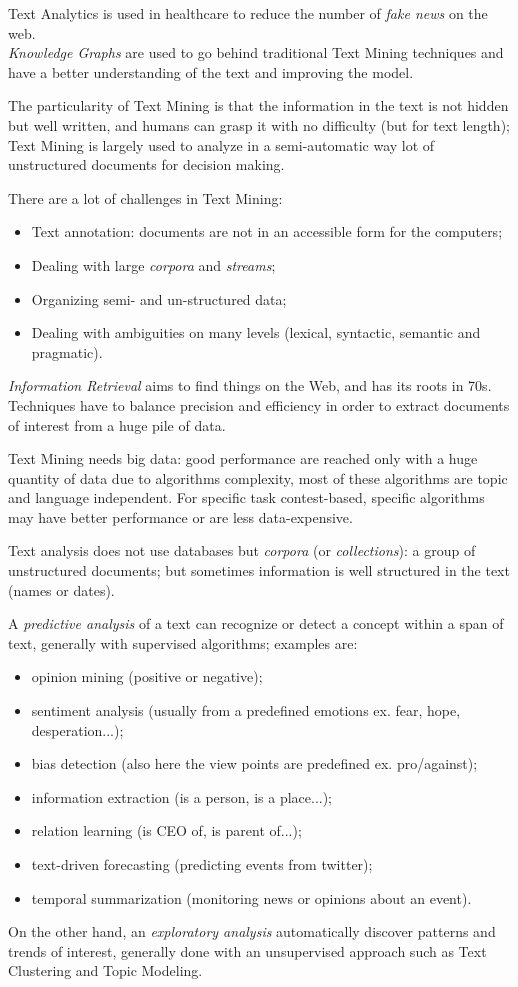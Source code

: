 \documentclass[11pt, a4page]{article}
\begin{document}
Text Analytics is used in healthcare to reduce the number of \textit{fake news} on the web.\\
\textit{Knowledge Graphs} are used to go behind traditional Text Mining techniques and have a better understanding of the text and improving the model.

The particularity of Text Mining is that the information in the text is not hidden but well written, and humans can grasp it with no difficulty (but for text length); Text Mining is largely used to analyze in a semi-automatic way lot of unstructured documents for decision making.

There are a lot of challenges in Text Mining:
\begin{itemize}[noitemsep]
\item Text annotation: documents are not in an accessible form for the computers;
\item Dealing with large \textit{corpora} and \textit{streams};
\item Organizing semi- and un-structured data;
\item Dealing with ambiguities on many levels (lexical, syntactic, semantic and pragmatic).
\end{itemize}

\textit{Information Retrieval} aims to find things on the Web, and has its roots in 70s.
Techniques have to balance precision and efficiency in order to extract documents of interest from a huge pile of data.

Text Mining needs big data: good performance are reached only with a huge quantity of data due to algorithms complexity, most of these algorithms are topic and language independent.
For specific task contest-based, specific algorithms may have better performance or are less data-expensive.

Text analysis does not use databases but \textit{corpora} (or \textit{collections}): a group of unstructured documents; but sometimes information is well structured in the text (names or dates). 

A \textit{predictive analysis} of a text can recognize or detect a concept within a span of text, generally with supervised algorithms; examples are:
\begin{itemize}[noitemsep]
	\item opinion mining (positive or negative);
	\item sentiment analysis (usually from a predefined emotions ex. fear, hope, desperation...);
	\item bias detection (also here the view points are predefined ex. pro/against);
	\item information extraction (is a person, is a place...);
	\item relation learning (is CEO of, is parent of...);
	\item text-driven forecasting (predicting events from twitter);
	\item temporal summarization (monitoring news or opinions about an event).
\end{itemize}
On the other hand, an \textit{exploratory analysis} automatically discover patterns and trends of interest, generally done with an unsupervised approach such as Text Clustering and Topic Modeling.
\end{document}
